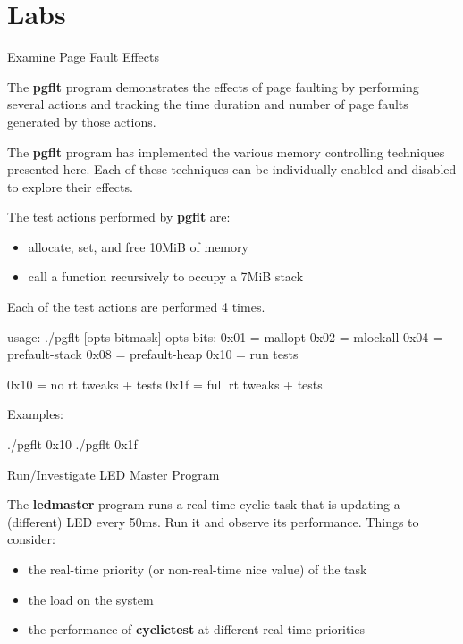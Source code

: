 \clearpage\section{Labs}\begin{Lab}

\begin{exe} {Examine Page Fault Effects}

   The \textbf{pgflt} program demonstrates the effects of
   page faulting by performing several actions and tracking
   the time duration and number of page faults generated by
   those actions.

   The \textbf{pgflt} program has implemented the various memory
   controlling techniques presented here. Each of these techniques
   can be individually enabled and disabled to explore their effects.

   The test actions performed by \textbf{pgflt} are:

   \begin{itemize}
      \item
      allocate, set, and free 10MiB of memory
      \item
      call a function recursively to occupy a 7MiB stack
   \end{itemize}

   Each of the test actions are performed 4 times.

   \begin{raw}
usage: ./pgflt [opts-bitmask]
  opts-bits:
  0x01 = mallopt
  0x02 = mlockall
  0x04 = prefault-stack
  0x08 = prefault-heap
  0x10 = run tests

  0x10 = no rt tweaks + tests
  0x1f = full rt tweaks + tests
   \end{raw}

  Examples:
   \begin{raw}
./pgflt 0x10
./pgflt 0x1f
   \end{raw}

\end{exe}

\clearpage

\begin{exe} {Run/Investigate LED Master Program}

   The \textbf{ledmaster} program runs a real-time cyclic task that
   is updating a (different) LED every 50ms. Run it and observe its
   performance. Things to consider:

   \begin{itemize}
      \item
      the real-time priority (or non-real-time nice value) of the task
      \item
      the load on the system
      \item
      the performance of \textbf{cyclictest} at different real-time
      priorities
   \end{itemize}


\end{exe}
\end{Lab}
